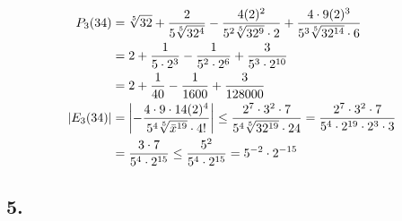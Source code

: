 \documentclass{article}
\begin{document}
\begin{align}
  P_3(34)
  &= \sqrt[5]{32} +
  \frac{2}{5 \sqrt[5]{32^4}} -
  \frac{4(2)^2}{5^2 \sqrt[5]{32^9} \cdot 2} +
  \frac{4 \cdot 9(2)^3}{5^3 \sqrt[5]{32^{14}} \cdot 6} \\
  &= 2 + \frac{1}{5 \cdot 2^3}
  -\frac{1}{5^2 \cdot 2^6}
  + \frac{3}{5^3 \cdot 2^{10}} \notag \\
  &= 2 + \frac{1}{40}
  -\frac{1}{1600}
  + \frac{3}{128000} \notag \\
  |E_3(34)|
  &= \left|-\frac{4 \cdot 9 \cdot 14(2)^4}
                 {5^4 \sqrt[5]{\bar{x}^{19}} \cdot 4!}\right|
  \leq \frac{2^7 \cdot 3^2 \cdot 7}{5^4\sqrt[5]{32^{19}} \cdot 24}
  = \frac{2^7 \cdot 3^2 \cdot 7}{5^4 \cdot 2^{19} \cdot 2^3 \cdot 3} \\
  &= \frac{3 \cdot 7}{5^4 \cdot 2^{15}}
  \leq \frac{5^2}{5^4 \cdot 2^{15}}
  = 5^{-2} \cdot 2^{-15}
\end{align}
\setcounter{equation}{0}
\clearpage


\subsection{5.}
\end{document}
